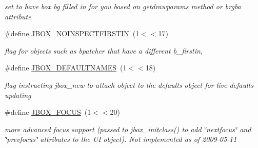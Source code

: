 \begin{DoxyCompactItemize}
\begin{DoxyCompactList}\small\item\em set to have box bg filled in for you based on getdrawparams method or brgba attribute \item\end{DoxyCompactList}\item 
\#define \hyperlink{group__jbox_ga789716317916c1e160d4ac0ef909446b}{JBOX\_\-NOINSPECTFIRSTIN}~(1$<$$<$17)
\begin{DoxyCompactList}\small\item\em flag for objects such as bpatcher that have a different b\_\-firstin, \item\end{DoxyCompactList}\item 
\hypertarget{group__jbox_ga321af2f1062fe6517c93769ffdcadb23}{
\#define \hyperlink{group__jbox_ga321af2f1062fe6517c93769ffdcadb23}{JBOX\_\-DEFAULTNAMES}~(1$<$$<$18)}
\label{group__jbox_ga321af2f1062fe6517c93769ffdcadb23}

\begin{DoxyCompactList}\small\item\em flag instructing jbox\_\-new to attach object to the defaults object for live defaults updating \item\end{DoxyCompactList}\item 
\hypertarget{group__jbox_ga965611b7e0990af5ded807ff00e06ac8}{
\#define \hyperlink{group__jbox_ga965611b7e0990af5ded807ff00e06ac8}{JBOX\_\-FOCUS}~(1$<$$<$20)}
\label{group__jbox_ga965611b7e0990af5ded807ff00e06ac8}

\begin{DoxyCompactList}\small\item\em more advanced focus support (passed to jbox\_\-initclass() to add \char`\"{}nextfocus\char`\"{} and \char`\"{}prevfocus\char`\"{} attributes to the UI object). Not implemented as of 2009-\/05-\/11 \item\end{DoxyCompactList}\end{DoxyCompactItemize}
